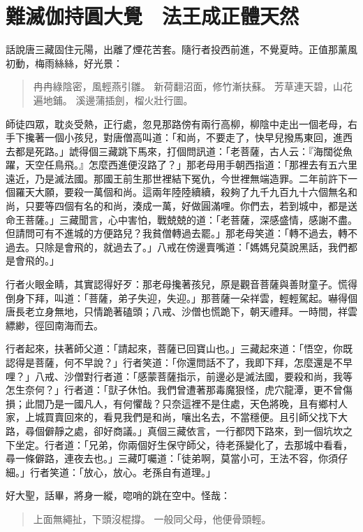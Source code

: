 
\chapter{難滅伽持圓大覺　法王成正體天然}

話說唐三藏固住元陽，出離了煙花苦套。隨行者投西前進，不覺夏時。正值那薰風初動，梅雨絲絲，好光景：
\begin{quote}
冉冉綠陰密，風輕燕引雛。
新荷翻沼面，修竹漸扶蘇。
芳草連天碧，山花遍地鋪。
溪邊蒲插劍，榴火壯行圖。
\end{quote}

師徒四眾，耽炎受熱，正行處，忽見那路傍有兩行高柳，柳陰中走出一個老母，右手下攙著一個小孩兒，對唐僧高叫道：「和尚，不要走了，快早兒撥馬東回，進西去都是死路。」諕得個三藏跳下馬來，打個問訊道：「老菩薩，古人云：『海闊從魚躍，天空任鳥飛。』怎麼西進便沒路了？」那老母用手朝西指道：「那裡去有五六里遠近，乃是滅法國。那國王前生那世裡結下冤仇，今世裡無端造罪。二年前許下一個羅天大願，要殺一萬個和尚。這兩年陸陸續續，殺夠了九千九百九十六個無名和尚，只要等四個有名的和尚，湊成一萬，好做圓滿哩。你們去，若到城中，都是送命王菩薩。」三藏聞言，心中害怕，戰兢兢的道：「老菩薩，深感盛情，感謝不盡。但請問可有不進城的方便路兒？我貧僧轉過去罷。」那老母笑道：「轉不過去，轉不過去。只除是會飛的，就過去了。」八戒在傍邊賣嘴道：「媽媽兒莫說黑話，我們都是會飛的。」

行者火眼金睛，其實認得好歹：那老母攙著孩兒，原是觀音菩薩與善財童子。慌得倒身下拜，叫道：「菩薩，弟子失迎，失迎。」那菩薩一朵祥雲，輕輕駕起。嚇得個唐長老立身無地，只情跪著磕頭；八戒、沙僧也慌跪下，朝天禮拜。一時間，祥雲縹緲，徑回南海而去。

行者起來，扶著師父道：「請起來，菩薩已回寶山也。」三藏起來道：「悟空，你既認得是菩薩，何不早說？」行者笑道：「你還問話不了，我即下拜，怎麼還是不早哩？」八戒、沙僧對行者道：「感蒙菩薩指示，前邊必是滅法國，要殺和尚，我等怎生奈何？」行者道：「獃子休怕。我們曾遭著那毒魔狠怪，虎穴龍潭，更不曾傷損；此間乃是一國凡人，有何懼哉？只奈這裡不是住處，天色將晚，且有鄉村人家，上城買賣回來的，看見我們是和尚，嚷出名去，不當穩便。且引師父找下大路，尋個僻靜之處，卻好商議。」真個三藏依言，一行都閃下路來，到一個坑坎之下坐定。行者道：「兄弟，你兩個好生保守師父，待老孫變化了，去那城中看看，尋一條僻路，連夜去也。」三藏叮囑道：「徒弟啊，莫當小可，王法不容，你須仔細。」行者笑道：「放心，放心。老孫自有道理。」

好大聖，話畢，將身一縱，唿哨的跳在空中。怪哉：
\begin{quote}
上面無繩扯，下頭沒棍撐。
一般同父母，他便骨頭輕。
\end{quote}

